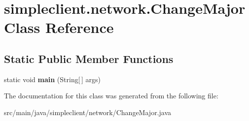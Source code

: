 \hypertarget{classsimpleclient_1_1network_1_1ChangeMajor}{}\section{simpleclient.\+network.\+Change\+Major Class Reference}
\label{classsimpleclient_1_1network_1_1ChangeMajor}
\subsection*{Static Public Member Functions}
\begin{DoxyCompactItemize}
\item 
\mbox{\label{classsimpleclient_1_1network_1_1ChangeMajor_a10006b9d61daf379805c10aaa5d37b72}} 
static void {\bfseries main} (String\mbox{[}$\,$\mbox{]} args)
\end{DoxyCompactItemize}


The documentation for this class was generated from the following file\+:\begin{DoxyCompactItemize}
\item 
src/main/java/simpleclient/network/Change\+Major.\+java\end{DoxyCompactItemize}
